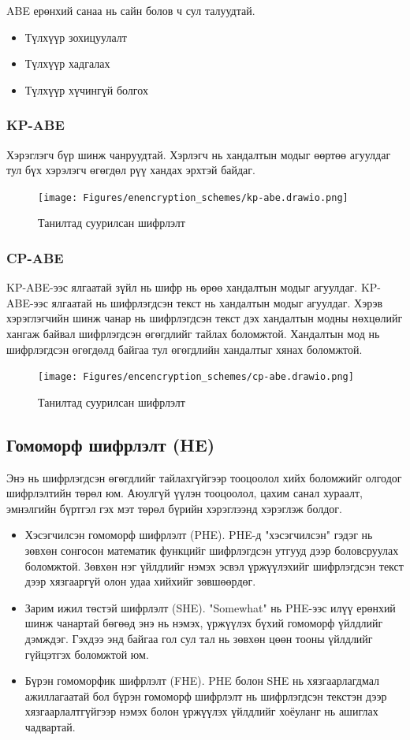 ABE ерөнхий санаа нь сайн болов ч сул талуудтай.
\begin{itemize}
    \item Түлхүүр зохицуулалт
    \item Түлхүүр хадгалах
    \item Түлхүүр хүчингүй болгох
\end{itemize}

\subsubsection*{KP-ABE}
Хэрэглэгч бүр шинж чанруудтай. Хэрлэгч нь хандалтын модыг өөртөө агуулдаг тул бүх хэрэлэгч өгөгдөл рүү хандах эрхтэй байдаг.
\begin{figure}[ht]
    \centering
    \texttt{[image: Figures/enencryption\_schemes/kp-abe.drawio.png]}
    \caption[IBE]{Танилтад суурилсан шифрлэлт}
    \label{fig:kp-abe}
\end{figure}

\subsubsection*{CP-ABE}
KP-ABE-ээс ялгаатай зүйл нь шифр нь өрөө хандалтын модыг агуулдаг. KP-ABE-ээс ялгаатай нь шифрлэгдсэн текст нь хандалтын модыг агуулдаг. Хэрэв хэрэглэгчийн шинж чанар нь шифрлэгдсэн текст дэх хандалтын модны нөхцөлийг хангаж байвал шифрлэгдсэн өгөгдлийг тайлах боломжтой. Хандалтын мод нь шифрлэгдсэн өгөгдөлд байгаа тул өгөгдлийн хандалтыг хянах боломжтой.
\begin{figure}[ht]
    \centering
    \texttt{[image: Figures/encencryption\_schemes/cp-abe.drawio.png]}
    \caption[IBE]{Танилтад суурилсан шифрлэлт}
    \label{fig:cp-abe}
\end{figure}

\subsection*{Гомоморф шифрлэлт (HE)}

Энэ нь шифрлэгдсэн өгөгдлийг тайлахгүйгээр тооцоолол хийх боломжийг олгодог шифрлэлтийн төрөл юм. Аюулгүй үүлэн тооцоолол, цахим санал хураалт, эмнэлгийн бүртгэл гэх мэт төрөл бүрийн хэрэглээнд хэрэглэж болдог.\cite{WikiHE}

\begin{itemize}
    \item Хэсэгчилсэн гомоморф шифрлэлт (PHE). PHE-д "хэсэгчилсэн" гэдэг нь зөвхөн сонгосон математик функцийг шифрлэгдсэн утгууд дээр боловсруулах боломжтой. Зөвхөн нэг үйлдлийг нэмэх эсвэл үржүүлэхийг шифрлэгдсэн текст дээр хязгааргүй олон удаа хийхийг зөвшөөрдөг.
    \item Зарим ижил төстэй шифрлэлт (SHE). "Somewhat" нь PHE-ээс илүү ерөнхий шинж чанартай бөгөөд энэ нь нэмэх, үржүүлэх бүхий гомоморф үйлдлийг дэмждэг. Гэхдээ энд байгаа гол сул тал нь зөвхөн цөөн тооны үйлдлийг гүйцэтгэх боломжтой юм.
    \item Бүрэн гомоморфик шифрлэлт (FHE). PHE болон SHE нь хязгаарлагдмал ажиллагаатай бол бүрэн гомоморф шифрлэлт нь шифрлэгдсэн текстэн дээр хязгаарлалтгүйгээр нэмэх болон үржүүлэх үйлдлийг хоёуланг нь ашиглах чадвартай.
\end{itemize}

